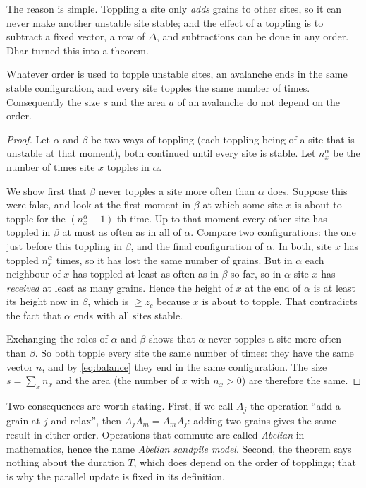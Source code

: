 The reason is simple. Toppling a site only \emph{adds} grains to other sites, so it can never make another unstable
site stable; and the effect of a toppling is to subtract a fixed vector, a row of $\Delta$, and subtractions can be
done in any order. Dhar turned this into a theorem.

\begin{theorem}
\label{thm:abelian}
Whatever order is used to topple unstable sites, an avalanche ends in the same stable configuration, and every site
topples the same number of times. Consequently the size $s$ and the area $a$ of an avalanche do not depend on the order.
\end{theorem}

\begin{proof}
Let $\alpha$ and $\beta$ be two ways of toppling (each toppling being of a site that is unstable at that moment), both
continued until every site is stable. Let $n^\alpha_x$ be the number of times site $x$ topples in $\alpha$.

We show first that $\beta$ never topples a site more often than $\alpha$ does. Suppose this were false, and look at the
first moment in $\beta$ at which some site $x$ is about to topple for the $(n^\alpha_x+1)$-th time. Up to that moment
every other site has toppled in $\beta$ at most as often as in all of $\alpha$. Compare two configurations: the one
just before this toppling in $\beta$, and the final configuration of $\alpha$. In both, site $x$ has toppled
$n^\alpha_x$ times, so it has lost the same number of grains. But in $\alpha$ each neighbour of $x$ has toppled at least
as often as in $\beta$ so far, so in $\alpha$ site $x$ has \emph{received} at least as many grains. Hence the height of
$x$ at the end of $\alpha$ is at least its height now in $\beta$, which is $\ge z_c$ because $x$ is about to topple. That
contradicts the fact that $\alpha$ ends with all sites stable.

Exchanging the roles of $\alpha$ and $\beta$ shows that $\alpha$ never topples a site more often than $\beta$. So both
topple every site the same number of times: they have the same vector $n$, and by \cref{eq:balance} they end in the
same configuration. The size $s = \sum_x n_x$ and the area (the number of $x$ with $n_x>0$) are therefore the same.
\end{proof}

Two consequences are worth stating. First, if we call $A_j$ the operation ``add a grain at $j$ and relax'', then
$A_jA_m = A_mA_j$: adding two grains gives the same result in either order. Operations that commute are called
\emph{Abelian} in mathematics, hence the name \emph{Abelian sandpile model}. Second, the theorem says nothing about the
duration $T$, which does depend on the order of topplings; that is why the parallel update is fixed in its definition.


